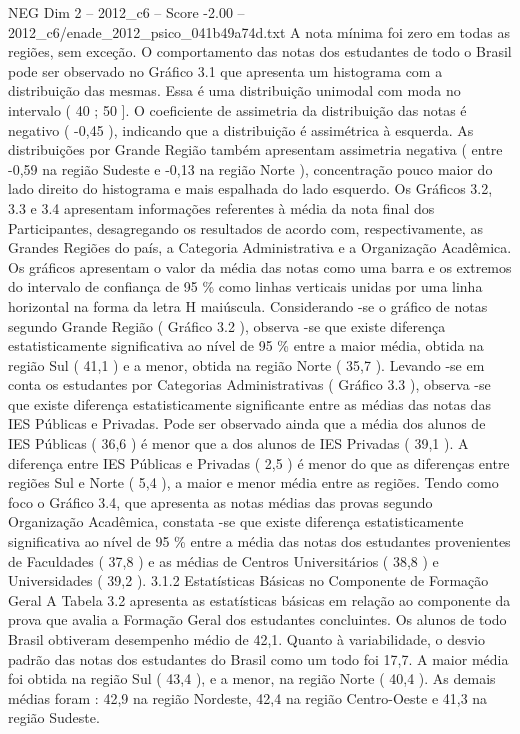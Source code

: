 \begin{textsample}{NEG Dim 2 – 2012\_c6 – Score -2.00 – 2012\_c6/enade\_2012\_psico\_041b49a74d.txt}
A nota mínima foi zero em todas as regiões, sem exceção.
O comportamento das notas dos estudantes de todo o Brasil pode ser observado no Gráfico 3.1 que apresenta um histograma com a distribuição das mesmas.
Essa é uma distribuição unimodal com moda no intervalo ( 40 ; 50 ].
O coeficiente de assimetria da distribuição das notas é negativo ( -0,45 ), indicando que a distribuição é assimétrica à esquerda.
As distribuições por Grande Região também apresentam assimetria negativa ( entre -0,59 na região Sudeste e -0,13 na região Norte ), concentração pouco maior do lado direito do histograma e mais espalhada do lado esquerdo.
Os Gráficos 3.2, 3.3 e 3.4 apresentam informações referentes à média da nota final dos Participantes, desagregando os resultados de acordo com, respectivamente, as Grandes Regiões do país, a Categoria Administrativa e a Organização Acadêmica.
Os gráficos apresentam o valor da média das notas como uma barra e os extremos do intervalo de confiança de 95 \% como linhas verticais unidas por uma linha horizontal na forma da letra H maiúscula.
Considerando -se o gráfico de notas segundo Grande Região ( Gráfico 3.2 ), observa -se que existe diferença estatisticamente significativa ao nível de 95 \% entre a maior média, obtida na região Sul ( 41,1 ) e a menor, obtida na região Norte ( 35,7 ).
Levando -se em conta os estudantes por Categorias Administrativas ( Gráfico 3.3 ), observa -se que existe diferença estatisticamente significante entre as médias das notas das IES Públicas e Privadas.
Pode ser observado ainda que a média dos alunos de IES Públicas ( 36,6 ) é menor que a dos alunos de IES Privadas ( 39,1 ).
A diferença entre IES Públicas e Privadas ( 2,5 ) é menor do que as diferenças entre regiões Sul e Norte ( 5,4 ), a maior e menor média entre as regiões.
Tendo como foco o Gráfico 3.4, que apresenta as notas médias das provas segundo Organização Acadêmica, constata -se que existe diferença estatisticamente significativa ao nível de 95 \% entre a média das notas dos estudantes provenientes de Faculdades ( 37,8 ) e as médias de Centros Universitários ( 38,8 ) e Universidades ( 39,2 ). 3.1.2 Estatísticas Básicas no Componente de Formação Geral A Tabela 3.2 apresenta as estatísticas básicas em relação ao componente da prova que avalia a Formação Geral dos estudantes concluintes.
Os alunos de todo Brasil obtiveram desempenho médio de 42,1.
Quanto à variabilidade, o desvio padrão das notas dos estudantes do Brasil como um todo foi 17,7.
A maior média foi obtida na região Sul ( 43,4 ), e a menor, na região Norte ( 40,4 ).
As demais médias foram : 42,9 na região Nordeste, 42,4 na região Centro-Oeste e 41,3 na região Sudeste.

\end{textsample}
